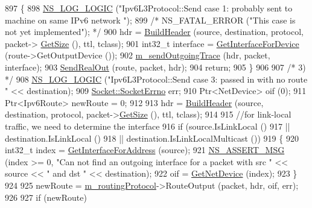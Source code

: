 \begin{DoxyCode}
897     \{
898       \hyperlink{group__logging_ga88acd260151caf2db9c0fc84997f45ce}{NS\_LOG\_LOGIC} (\textcolor{stringliteral}{"Ipv6L3Protocol::Send case 1: probably sent to machine on same IPv6 network
      "});
899       \textcolor{comment}{/* NS\_FATAL\_ERROR ("This case is not yet implemented"); */}
900       hdr = \hyperlink{classns3_1_1Ipv6L3Protocol_a5374a6687ad09cfcd48ef13a99b48d16}{BuildHeader} (source, destination, protocol, packet->
      \hyperlink{classns3_1_1Packet_a462855c9929954d4301a4edfe55f4f1c}{GetSize} (), ttl, tclass);
901       int32\_t \textcolor{keyword}{interface }= \hyperlink{classns3_1_1Ipv6L3Protocol_a878292513d6294e2dfdeccbe1ed1d996}{GetInterfaceForDevice} (route->GetOutputDevice ());
902       \hyperlink{classns3_1_1Ipv6L3Protocol_aac1ff242aa91275202e37cf7d805eec8}{m\_sendOutgoingTrace} (hdr, packet, interface);
903       \hyperlink{classns3_1_1Ipv6L3Protocol_adad363af4c50cd94505b918b15f228d4}{SendRealOut} (route, packet, hdr);
904       \textcolor{keywordflow}{return};
905     \}
906 
907   \textcolor{comment}{/* 3) */}
908   \hyperlink{group__logging_ga88acd260151caf2db9c0fc84997f45ce}{NS\_LOG\_LOGIC} (\textcolor{stringliteral}{"Ipv6L3Protocol::Send case 3: passed in with no route "} << destination);
909   \hyperlink{classns3_1_1Socket_ada1328c5ae0c28cb2a982caf8f6d6cca}{Socket::SocketErrno} err;
910   Ptr<NetDevice> oif (0);
911   Ptr<Ipv6Route> newRoute = 0;
912 
913   hdr = \hyperlink{classns3_1_1Ipv6L3Protocol_a5374a6687ad09cfcd48ef13a99b48d16}{BuildHeader} (source, destination, protocol, packet->\hyperlink{classns3_1_1Packet_a462855c9929954d4301a4edfe55f4f1c}{GetSize} (), ttl, tclass);
914 
915   \textcolor{comment}{//for link-local traffic, we need to determine the interface}
916   \textcolor{keywordflow}{if} (source.IsLinkLocal ()
917       || destination.IsLinkLocal ()
918       || destination.IsLinkLocalMulticast ())
919     \{
920       int32\_t index = \hyperlink{classns3_1_1Ipv6L3Protocol_ae8d652431e374e8b05425ae9e1bf0f1b}{GetInterfaceForAddress} (source);
921       \hyperlink{assert_8h_aff5ece9066c74e681e74999856f08539}{NS\_ASSERT\_MSG} (index >= 0, \textcolor{stringliteral}{"Can not find an outgoing interface for a packet with src "} 
      << source << \textcolor{stringliteral}{" and dst "} << destination);
922       oif = \hyperlink{classns3_1_1Ipv6L3Protocol_a574d1beafc86062acf582e75dc437a47}{GetNetDevice} (index);
923     \}
924 
925   newRoute = \hyperlink{classns3_1_1Ipv6L3Protocol_aa0df547e5240b218dc1f4742a2a00117}{m\_routingProtocol}->RouteOutput (packet, hdr, oif, err);
926 
927   \textcolor{keywordflow}{if} (newRoute)

\end{DoxyCode}
